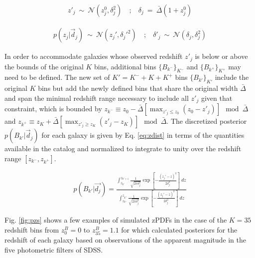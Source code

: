 \documentclass[preprint]{aastex}
\begin{document}
\begin{eqnarray}
\label{eq:zshift}
z'_{j}\ \sim\ \mathcal{N}(z_{j}^{0},\delta_{j}^{2})\ &;&\ \delta_{j}\ =\ \bar{\Delta}(1+z^{0}_{j})
\end{eqnarray}

\begin{eqnarray}
\label{eq:zspread}
p(z_{j}|\vec{d}_{j})\ \sim\ \mathcal{N}(z_{j}',\delta_{j}'^{2})\ &;&\ \delta'_{j}\ \sim\ \mathcal{N}(\delta_{j},\delta_{j}^{2})
\end{eqnarray}


In order to accommodate galaxies whose observed redshift $z'_{j}$ is below or above the bounds of the original $K$ bins, additional bins $\{B_{k^{-}}\}_{K^{-}}$ and $\{B_{k^{+}}\}_{K^{+}}$ may need to be defined.  The new set of $K'=K^{-}+K+K^{+}$ bins $\{B_{k'}\}_{K'}$ include the original $K$ bins but add the newly defined bins that share the original width $\bar{\Delta}$ and span the minimal redshift range necessary to include all $z'_{j}$ given that constraint, which is bounded by $z_{k^{-}}\equiv z_{0}-\bar{\Delta}[\max_{z'_{j}\leq z_{0}}(z_{0}-z'_{j})]\mod\bar{\Delta}$ and $z_{k^{+}}\equiv z_{K}+\bar{\Delta}[\max_{z'_{j}\geq z_{K}}(z'_{j}-z_{K})]\mod\bar{\Delta}$.  The discretized posterior $p(B_{k'}|\vec{d}_{j})$ for each galaxy is given by Eq. \ref{eq:zdist} in terms of the quantities available in the catalog and normalized to integrate to unity over the redshift range $[z_{k^{-}},z_{k^{+}}]$.  

\begin{eqnarray}
\label{eq:zdist}
p(B_{k'}|\vec{d_{j}}) = \frac{\int_{z_{k'}}^{z_{k'+1}} \frac{1}{\sqrt{2\pi\delta_{j}^{2}}}\exp\left[-\frac{(z_{j}'-z)^{2}}{2\delta_{j}^{2}}\right]\ dz}{\int_{z_{k^{-}}}^{z_{k^{+}}} \frac{1}{\sqrt{2\pi\delta_{j}^{2}}}\exp\left[-\frac{(z_{j}'-z)^{2}}{2\delta_{j}^{2}}\right]\ dz}
\end{eqnarray}

Fig. \ref{fig:pzs} shows a few examples of simulated zPDFs in the case of the $K=35$ redshift bins from $z^{B}_{0}=0$ to $z^{B}_{35}=1.1$ for which \citet{she11} calculated posteriors for the redshift of each galaxy based on observations of the apparent magnitude in the five photometric filters of SDSS.  
\end{document}
